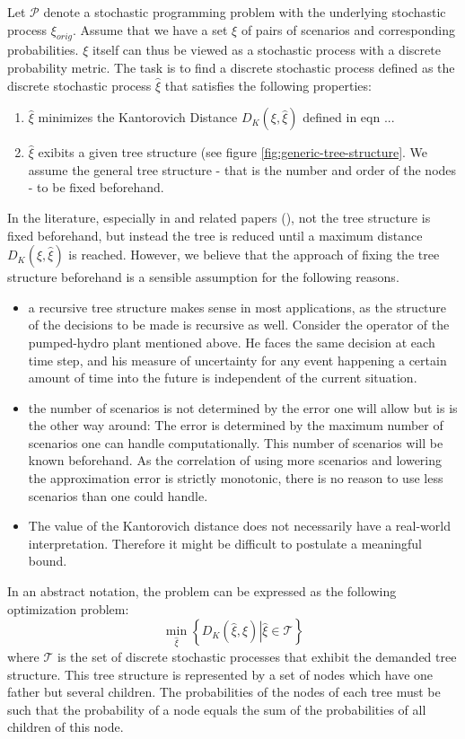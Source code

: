 \documentclass[a4paper, 12pt] {article}
\begin{document}
Let $\mathcal{P}$ denote a stochastic programming problem with the underlying stochastic process $\xi_{orig}$. Assume that we have a set $\xi$ of pairs of scenarios and corresponding probabilities. $\xi$ itself can thus be viewed as a stochastic process with a discrete probability metric. The task is to find a discrete stochastic process defined as the discrete stochastic process $\hat{\xi}$ that satisfies the following properties:
\begin{enumerate}
\item $\hat{\xi}$ minimizes the Kantorovich Distance $D_K(\xi,\hat{\xi})$ defined in eqn ...
\item $\hat{\xi}$ exibits a given tree structure (see figure \ref{fig:generic-tree-structure}. We assume the general tree structure - that is the number and order of the nodes - to be fixed beforehand. 
\end{enumerate}
In the literature, especially in \cite{Heitsch2009} and related papers (\cite{Dupacova2003}), not the tree structure is fixed beforehand, but instead the tree is reduced until a maximum distance $D_K(\xi,\hat{\xi})$ is reached. However, we believe that the approach of fixing the tree structure beforehand is a sensible assumption for the following reasons.
\begin{itemize}
\item a recursive tree structure makes sense in most applications, as the structure of the decisions to be made is recursive as well. Consider the operator of the pumped-hydro plant mentioned above. He faces the same decision at each time step, and his measure of uncertainty for any event happening a certain amount of time into the future is independent of the current situation.
\item the number of scenarios is not determined by the error one will allow but is is the other way around: The error is determined by the maximum number of scenarios one can handle computationally. This number of scenarios will be known beforehand. As the correlation of using more scenarios and lowering the approximation error is strictly monotonic, there is no reason to use less scenarios than one could handle.
\item The value of the Kantorovich distance does not necessarily have a real-world interpretation. Therefore it might be difficult to postulate a meaningful bound.
\end{itemize}

In an abstract notation, the problem can be expressed as the following optimization problem:
\begin{equation}
  \label{eq:symbolic-optimization-problem}
  \min_{\hat{\xi}}\left\{D_K(\hat{\xi}, \xi)\left|\hat{\xi} \in \mathcal{T}\right.\right\}
\end{equation}
where $\mathcal{T}$ is the set of discrete stochastic processes that exhibit the demanded tree structure. This tree structure is represented by a set of nodes which have one father but several children. The probabilities of the nodes of each tree must be such that the probability of a node equals the sum of the probabilities of all children of this node. 
\end{document}
